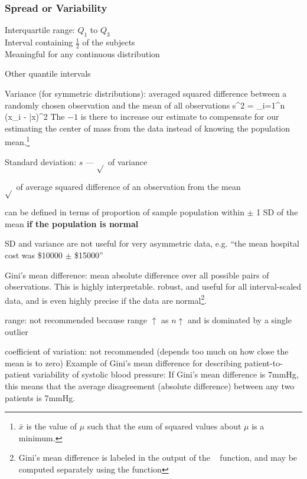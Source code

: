 \subsubsection{Spread or Variability}
\bi
\item Interquartile range: $Q_{1}$ to $Q_{3}$ \\
Interval containing $\frac{1}{2}$ of the subjects \\
Meaningful for any continuous distribution
\item Other quantile intervals
\item Variance (for symmetric distributions): averaged squared
  difference between a randomly chosen observation and the mean of all
  observations
\beq
s^{2} =  \sum_{i=1}^{n} (x_{i} - \bar{x})^2
\eeq
The $-1$ is there to increase our estimate to compensate for our
estimating the center of mass from the data instead of knowing the
population mean.\footnote{$\bar{x}$ is the value of $\mu$ such that
  the sum of squared values about $\mu$ is a minimum.}
\item Standard deviation: $s$ --- $\sqrt{}$ of variance
 \bi 
 \item $\sqrt{}$ of average squared difference of an observation from
   the mean
 \item can be defined in terms of proportion of sample population within
   $\pm$ 1 SD of the mean \textbf{if the population is normal}
 \ei
\item SD and variance are not useful for very asymmetric data,
  e.g. ``the mean hospital cost was \$10000 $\pm$ \$15000''
\item Gini's mean difference: mean absolute difference over all
  possible pairs of observations.  This is highly interpretable. robust, and
  useful for all interval-scaled data, and is even highly precise if
  the data are normal\footnote{Gini's mean difference is labeled
     in the output of the \R\   function,
    and may be computed separately using the   function}.
\item range: not recommended because range $\uparrow$ as $n\uparrow$
  and is dominated by a single outlier
\item coefficient of variation: not recommended (depends too much on
  how close the mean is to zero)
\ei
Example of Gini's mean difference for describing patient-to-patient
variability of systolic blood pressure: If Gini's mean difference is
7mmHg, this means that the average disagreement (absolute difference)
between any two patients is 7mmHg.
\clearpage
